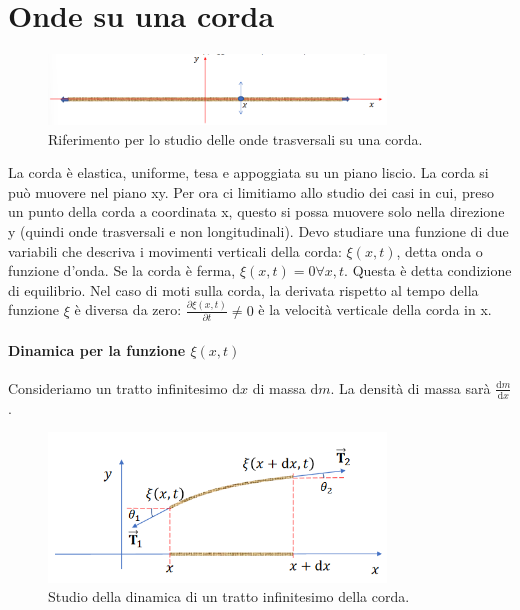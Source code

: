 \section{Onde su una corda}

\begin{figure}[H]
	\centering
	\includegraphics[width=0.8\textwidth]{2024-03-07-10-29-38.png}
	\caption{Riferimento per lo studio delle onde trasversali su una corda.}
\end{figure}

La corda è elastica, uniforme, tesa e appoggiata su un piano liscio. La corda si può muovere nel piano xy. Per ora ci limitiamo allo studio dei casi in cui, preso un punto della corda a coordinata x, questo si possa muovere solo nella direzione y (quindi onde trasversali e non longitudinali). Devo studiare una funzione di due variabili che descriva i movimenti verticali della corda: \(\xi (x,t)\), detta onda o funzione d'onda. Se la corda è ferma, \(\xi (x,t) = 0 \forall x,t\). Questa è detta condizione di equilibrio. Nel caso di moti sulla corda, la derivata rispetto al tempo della funzione \(\xi \) è diversa da zero: \(\frac{\partial \xi (x,t)}{\partial t} \neq 0\) è la velocità verticale della corda in x.

\paragraph{Dinamica per la funzione \(\xi (x,t)\) } Consideriamo un tratto infinitesimo \(\mathrm{d} x \) di massa \(\mathrm{d} m \). La densità di massa sarà \(\frac{\mathrm{d}m}{\mathrm{d}x} 	\).

\begin{figure}[H]
	\centering
	\includegraphics[width=0.8\textwidth]{2024-03-07-10-36-23.png}
	\caption{Studio della dinamica di un tratto infinitesimo della corda.}
\end{figure}

